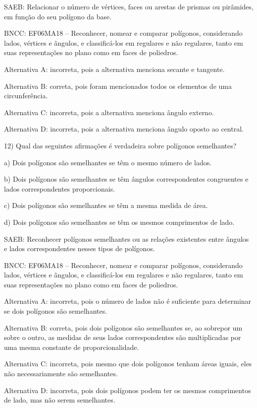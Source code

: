 SAEB: Relacionar o número de vértices, faces ou arestas de prismas ou
pirâmides, em função do seu polígono da base.

BNCC: EF06MA18 -- Reconhecer, nomear e comparar polígonos, considerando
lados, vértices e ângulos, e classificá-los em regulares e não
regulares, tanto em suas representações no plano como em faces de
poliedros.

Alternativa A: incorreta, pois a alternativa menciona secante e
tangente.

Alternativa B: correta, pois foram mencionados todos os elementos de uma
circunferência.

Alternativa C: incorreta, pois a alternativa menciona ângulo externo.

Alternativa D: incorreta, pois a alternativa menciona ângulo oposto ao
central.

12) Qual das seguintes afirmações é verdadeira sobre polígonos
semelhantes?

a) Dois polígonos são semelhantes se têm o mesmo número de lados.

b) Dois polígonos são semelhantes se têm ângulos correspondentes
congruentes e lados correspondentes proporcionais.

c) Dois polígonos são semelhantes se têm a mesma medida de área.

d) Dois polígonos são semelhantes se têm os mesmos comprimentos de lado.

SAEB: Reconhecer polígonos semelhantes ou as relações existentes entre
ângulos e lados correspondentes nesses tipos de polígonos.

BNCC: EF06MA18 -- Reconhecer, nomear e comparar polígonos, considerando
lados, vértices e ângulos, e classificá-los em regulares e não
regulares, tanto em suas representações no plano como em faces de
poliedros.

Alternativa A: incorreta, pois o número de lados não é suficiente para
determinar se dois polígonos são semelhantes.

Alternativa B: correta, pois dois polígonos são semelhantes se, ao
sobrepor um sobre o outro, as medidas de seus lados correspondentes são
multiplicadas por uma mesma constante de proporcionalidade.

Alternativa C: incorreta, pois mesmo que dois polígonos tenham áreas
iguais, eles não necessariamente são semelhantes.

Alternativa D: incorreta, pois dois polígonos podem ter os mesmos
comprimentos de lado, mas não serem semelhantes.

